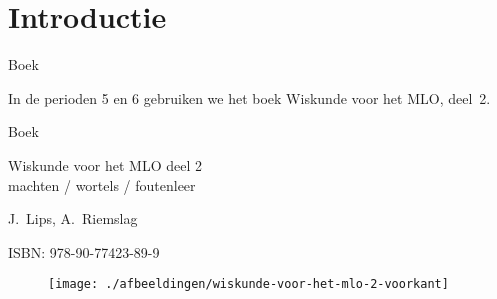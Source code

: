 \section{Introductie}
% 
% 
 \begin{frame}{Boek}

In de perioden 5 en 6 gebruiken we het boek Wiskunde voor het MLO, deel~2. 


\begin{block}{Boek}
\begin{minipage}{.70\textwidth} %
Wiskunde voor het MLO deel 2\\
machten / wortels / foutenleer


\bigskip
J.~Lips, A.~Riemslag

\bigskip
ISBN: 978-90-77423-89-9
\vfill
\end{minipage} %
\begin{minipage}{.25\textwidth} %
\begin{figure}
\texttt{[image: ./afbeeldingen/wiskunde-voor-het-mlo-2-voorkant]} 
\end{figure}
\end{minipage}
\end{block}
\end{frame}

